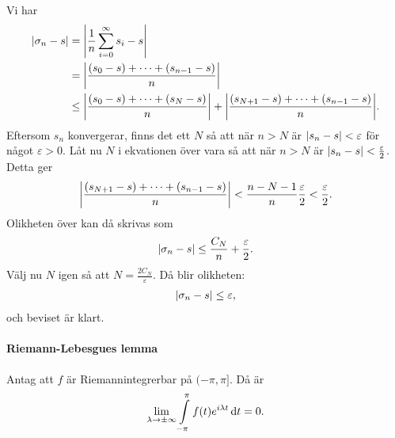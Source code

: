 \proof
Vi har
\begin{align*}
	\abs{\sigma_{n} - s} &= \abs{\frac{1}{n}\sum\limits_{i = 0}^{\infty}s_{i} - s} \\
	                     &= \abs{\frac{(s_{0} - s) + \dots + (s_{n - 1} - s)}{n}} \\
	                     &\leq  \abs{\frac{(s_{0} - s) + \dots + (s_{N} - s)}{n}} + \abs{\frac{(s_{N + 1} - s) + \dots + (s_{n - 1} - s)}{n}}.
\end{align*}
Eftersom $s_{n}$ konvergerar, finns det ett $N$ så att när $n > N$ är $\abs{s_{n} - s} < \varepsilon$ för något $\varepsilon > 0$. Låt nu $N$ i ekvationen över vara så att när $n > N$ är $\abs{s_{n} - s} < \frac{\varepsilon}{2}$. Detta ger
\begin{align*}
	\abs{\frac{(s_{N + 1} - s) + \dots + (s_{n - 1} - s)}{n}} < \frac{n - N - 1}{n}\frac{\varepsilon}{2} < \frac{\varepsilon}{2}.
\end{align*}
Olikheten över kan då skrivas som
\begin{align*}
	\abs{\sigma_{n} - s} \leq \frac{C_{N}}{n} + \frac{\varepsilon}{2}.
\end{align*}
Välj nu $N$ igen så att $N = \frac{2C_{N}}{\varepsilon}$. Då blir olikheten:
\begin{align*}
	\abs{\sigma_{n} - s} \leq \varepsilon,
\end{align*}
och beviset är klart.

\paragraph{Riemann-Lebesgues lemma}
Antag att $f$ är Riemannintegrerbar på $(-\pi, \pi]$. Då är
\begin{align*}
	\lim\limits_{\lambda\to\pm\infty}\int\limits_{-\pi}^{\pi}f(t)e^{i\lambda t}\dd{t} = 0.
\end{align*}

